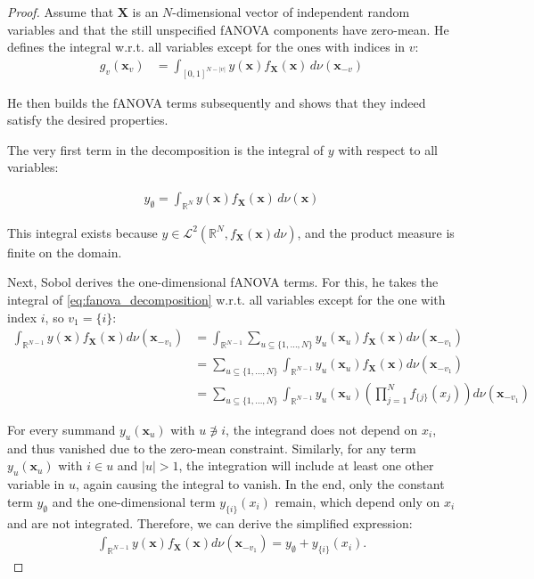 \begin{proof}
    Assume that $\boldsymbol{X}$ is an $N$-dimensional vector of independent random variables and
    that the still unspecified fANOVA components have zero-mean. He defines the integral w.r.t. all variables except for the ones with indices in \( v \):
    \begin{align*}
        g_v(\boldsymbol{x}_v) &= \int_{[0, 1]^{N - |v|}} y(\boldsymbol{x}) f_{\boldsymbol{X}}(\boldsymbol{x}) \, d\nu (\boldsymbol{x}_{-v})
    \end{align*}

He then builds the fANOVA terms subsequently and shows that they indeed satisfy the desired properties.\par
The very first term in the decomposition is the integral of \( y \) with respect to all variables:

\begin{align*}
    y_{\emptyset} = \int_{\mathbb{R}^N} y(\boldsymbol{x}) f_{\boldsymbol{X}}(\boldsymbol{x}) \, d\nu(\boldsymbol{x})
\end{align*}

This integral exists because \( y \in \mathcal{L}^2(\mathbb{R}^N, f_{\boldsymbol{X}}(\boldsymbol{x}) d\nu) \), and the product measure is finite on the domain.

Next, Sobol derives the one-dimensional fANOVA terms. For this, he takes the integral of \autoref{eq:fanova_decomposition} w.r.t. all variables except for the one with index \( i \), so $v_1 = \{i\}$:
\begin{align*}
    \int_{\mathbb{R}^{N-1}} y(\boldsymbol{x}) f_{\boldsymbol{X}}(\boldsymbol{x}) d\nu (\boldsymbol{x}_{-v_1}) 
    &= \int_{\mathbb{R}^{N-1}} \sum_{u \subseteq \{1, \dots, N\}} y_{u}(\boldsymbol{x}_u) f_{\boldsymbol{X}}(\boldsymbol{x}) d\nu (\boldsymbol{x}_{-v_1}) \\
    &= \sum_{u \subseteq \{1, \dots, N\}} \int_{\mathbb{R}^{N-1}} y_{u}(\boldsymbol{x}_u) f_{\boldsymbol{X}}(\boldsymbol{x}) d\nu (\boldsymbol{x}_{-v_1}) \\
    &= \sum_{u \subseteq \{1, \dots, N\}} \int_{\mathbb{R}^{N-1}} y_{u}(\boldsymbol{x}_u) \left( \prod_{j=1}^N f_{{\{j\}}}(x_j) \right) d\nu (\boldsymbol{x}_{-v_1})
\end{align*}

For every summand \( y_u(\boldsymbol{x}_u) \) with \( u \not\ni i \), the integrand does not depend on \( x_i \), and thus vanished due to the zero-mean constraint.
Similarly, for any term \( y_u(\boldsymbol{x}_u) \) with \( i \in u \) and \( |u| > 1 \), the integration will include at least one other variable in \( u \), again causing the integral to vanish.
In the end, only the constant term \( y_{\emptyset} \) and the one-dimensional term \( y_{\{i\}}(x_i) \) remain, which depend only on \( x_i \) and are not integrated.
Therefore, we can derive the simplified expression:
\begin{align*}
    \int_{\mathbb{R}^{N-1}} y(\boldsymbol{x}) f_{\boldsymbol{X}}(\boldsymbol{x}) d\nu (\boldsymbol{x}_{-v_1}) = y_{\emptyset} + y_{\{i\}}(x_i).
\end{align*}


\end{proof}
